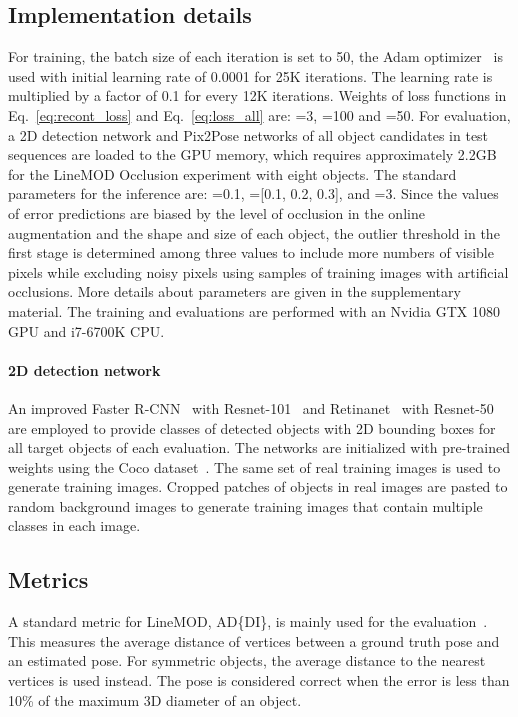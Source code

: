 \documentclass[10pt,twocolumn,letterpaper]{article}
\begin{document}
\subsection{Implementation details}
For training, the batch size of each iteration is set to 50, the Adam optimizer~\cite{kingma2014adam} is used with initial learning rate of 0.0001 for 25K iterations. The learning rate is multiplied by a factor of 0.1 for every 12K iterations. Weights of loss functions in Eq.~\ref{eq:recont_loss} and Eq.~\ref{eq:loss_all} are: =3, =100 and =50.
For evaluation, a 2D detection network and Pix2Pose networks of all object candidates in test sequences are loaded to the GPU memory, which requires approximately 2.2GB for the LineMOD Occlusion experiment with eight objects. The standard parameters for the inference are: =0.1, =[0.1, 0.2, 0.3], and =3. Since the values of error predictions are biased by the level of occlusion in the online augmentation and the shape and size of each object, the outlier threshold  in the first stage is determined among three values to include more numbers of visible pixels while excluding noisy pixels using samples of training images with artificial occlusions. More details about parameters are given in the supplementary material. The training and evaluations are performed with an Nvidia GTX 1080 GPU and i7-6700K CPU.   

\paragraph{2D detection network}
An improved Faster R-CNN~\cite{he2017mask,cnn:fastercnn} with Resnet-101~\cite{he2016deep_resnet} and Retinanet~\cite{Lin_2017_ICCV_retinanet} with Resnet-50 are employed to provide classes of detected objects with 2D bounding boxes for all target objects of each evaluation. The networks are initialized with pre-trained weights using the Coco dataset~\cite{lin2014mscoco}.  The same set of real training images is used to generate training images. Cropped patches of objects in real images are pasted to random background images to generate training images that contain multiple classes in each image.


\subsection{Metrics}
A standard metric for LineMOD, AD\{DI\}, is mainly used for the evaluation~\cite{linemode_hinterstoisser2012}. This measures the average distance of vertices between a ground truth pose and an estimated pose. For symmetric objects, the average distance to the nearest vertices is used instead. The pose is considered correct when the error is less than 10\% of the maximum 3D diameter of an object. 
  
\end{document}
